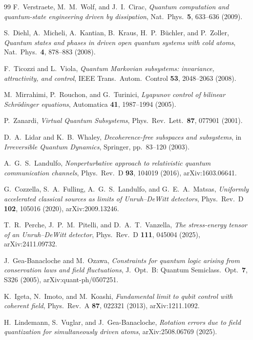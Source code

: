 \documentclass[aps,pre,onecolumn,superscriptaddress,floatfix,longbibliography]{revtex4-2}
\begin{document}
\begin{thebibliography}{99}
F.~Verstraete, M.~M.~Wolf, and J.~I.~Cirac, \emph{Quantum computation and quantum-state engineering driven by dissipation}, Nat.\ Phys.\ \textbf{5}, 633--636 (2009).

S.~Diehl, A.~Micheli, A.~Kantian, B.~Kraus, H.~P.~B\"uchler, and P.~Zoller, \emph{Quantum states and phases in driven open quantum systems with cold atoms}, Nat.\ Phys.\ \textbf{4}, 878--883 (2008).

F.~Ticozzi and L.~Viola, \emph{Quantum Markovian subsystems: invariance, attractivity, and control}, IEEE Trans.\ Autom.\ Control \textbf{53}, 2048--2063 (2008).

M.~Mirrahimi, P.~Rouchon, and G.~Turinici, \emph{Lyapunov control of bilinear Schr\"odinger equations}, Automatica \textbf{41}, 1987--1994 (2005).

P.~Zanardi, \emph{Virtual Quantum Subsystems}, Phys.\ Rev.\ Lett.\ \textbf{87}, 077901 (2001).

D.~A.~Lidar and K.~B.~Whaley, \emph{Decoherence-free subspaces and subsystems}, in \emph{Irreversible Quantum Dynamics}, Springer, pp.\ 83--120 (2003).

A.~G.~S.~Landulfo, \emph{Nonperturbative approach to relativistic quantum communication channels}, Phys.\ Rev.\ D \textbf{93}, 104019 (2016), arXiv:1603.06641.

G.~Cozzella, S.~A.~Fulling, A.~G.~S.~Landulfo, and G.~E.~A.~Matsas, \emph{Uniformly accelerated classical sources as limits of Unruh--DeWitt detectors}, Phys.\ Rev.\ D \textbf{102}, 105016 (2020), arXiv:2009.13246.

T.~R.~Perche, J.~P.~M.~Pitelli, and D.~A.~T.~Vanzella, \emph{The stress-energy tensor of an Unruh--DeWitt detector}, Phys.\ Rev.\ D \textbf{111}, 045004 (2025), arXiv:2411.09732.

J.~Gea-Banacloche and M.~Ozawa, \emph{Constraints for quantum logic arising from conservation laws and field fluctuations}, J.\ Opt.\ B: Quantum Semiclass.\ Opt.\ \textbf{7}, S326 (2005), arXiv:quant-ph/0507251.

K.~Igeta, N.~Imoto, and M.~Koashi, \emph{Fundamental limit to qubit control with coherent field}, Phys.\ Rev.\ A \textbf{87}, 022321 (2013), arXiv:1211.1092.

H.~Lindemann, S.~Vuglar, and J.~Gea-Banacloche, \emph{Rotation errors due to field quantization for simultaneously driven atoms}, arXiv:2508.06769 (2025).


\end{thebibliography}
\end{document}
